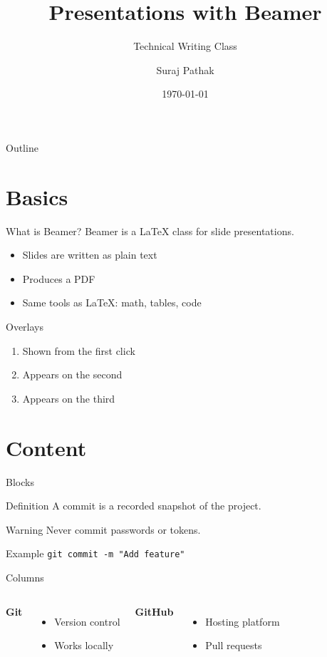 \documentclass[aspectratio=169]{beamer}
\title[Beamer Demo]{Presentations with Beamer}
\subtitle{Technical Writing Class}
\author{Suraj Pathak}
\institute[MNIT]{MNIT Jaipur}
\date{\today}
\begin{document}
\begin{frame}
  \titlepage
\end{frame}

\begin{frame}{Outline}
  \tableofcontents
\end{frame}

\section{Basics}
\begin{frame}{What is Beamer?}
  Beamer is a \LaTeX{} class for slide presentations.
  \begin{itemize}
    \item Slides are written as plain text
    \item Produces a PDF
    \item Same tools as \LaTeX{}: math, tables, code
  \end{itemize}
\end{frame}

\begin{frame}{Overlays}
  \begin{enumerate}
    \item<1-> Shown from the first click
    \item<2-> Appears on the second
    \item<3-> Appears on the third
  \end{enumerate}
\end{frame}

\section{Content}
\begin{frame}{Blocks}
  \begin{block}{Definition}
    A commit is a recorded snapshot of the project.
  \end{block}
  \begin{alertblock}{Warning}
    Never commit passwords or tokens.
  \end{alertblock}
  \begin{exampleblock}{Example}
    \texttt{git commit -m "Add feature"}
  \end{exampleblock}
\end{frame}

\begin{frame}{Columns}
  \begin{columns}
    \textbf{Git}
    \begin{itemize}
      \item Version control
      \item Works locally
    \end{itemize}
    \textbf{GitHub}
    \begin{itemize}
      \item Hosting platform
      \item Pull requests
    \end{itemize}
  \end{columns}
\end{frame}
\end{document}
